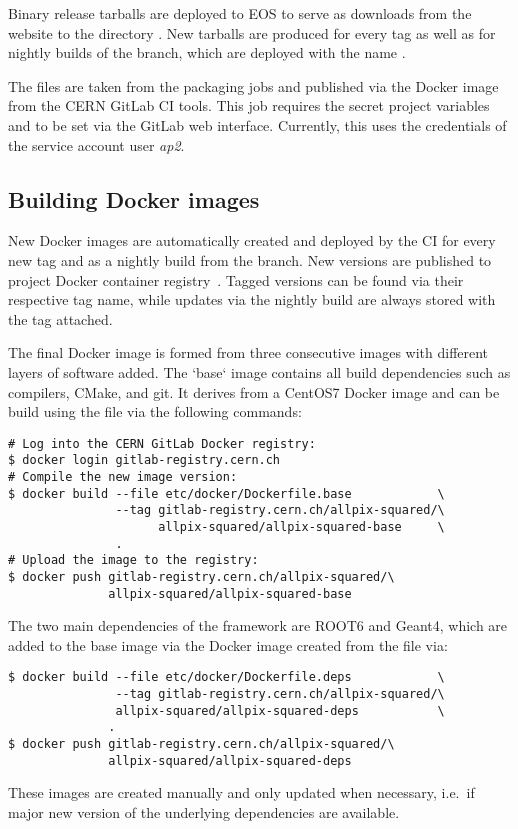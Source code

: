 Binary release tarballs are deployed to EOS to serve as downloads from the website to the directory .
New tarballs are produced for every tag as well as for nightly builds of the  branch, which are deployed with the name .

The files are taken from the packaging jobs and published via the  Docker image from the CERN GitLab CI tools.
This job requires the secret project variables  and  to be set via the GitLab web interface.
Currently, this uses the credentials of the service account user \emph{ap2}.

\subsection{Building Docker images}
\label{sec:build-docker}

New \apsq Docker images are automatically created and deployed by the CI for every new tag and as a nightly build from the  branch.
New versions are published to project Docker container registry~\cite{ap2-container-registry}.
Tagged versions can be found via their respective tag name, while updates via the nightly build are always stored with the  tag attached.

The final Docker image is formed from three consecutive images with different layers of software added.
The `base` image contains all build dependencies such as compilers, CMake, and git.
It derives from a CentOS7 Docker image and can be build using the  file via the following commands:

\begin{verbatim}
# Log into the CERN GitLab Docker registry:
$ docker login gitlab-registry.cern.ch
# Compile the new image version:
$ docker build --file etc/docker/Dockerfile.base            \
               --tag gitlab-registry.cern.ch/allpix-squared/\
                     allpix-squared/allpix-squared-base     \
               .
# Upload the image to the registry:
$ docker push gitlab-registry.cern.ch/allpix-squared/\
              allpix-squared/allpix-squared-base
\end{verbatim}

The two main dependencies of the framework are ROOT6 and Geant4, which are added to the base image via the  Docker image created from the file  via:
\begin{verbatim}
$ docker build --file etc/docker/Dockerfile.deps            \
               --tag gitlab-registry.cern.ch/allpix-squared/\
               allpix-squared/allpix-squared-deps           \
              .
$ docker push gitlab-registry.cern.ch/allpix-squared/\
              allpix-squared/allpix-squared-deps
\end{verbatim}
These images are created manually and only updated when necessary, i.e.\ if major new version of the underlying dependencies are available.

